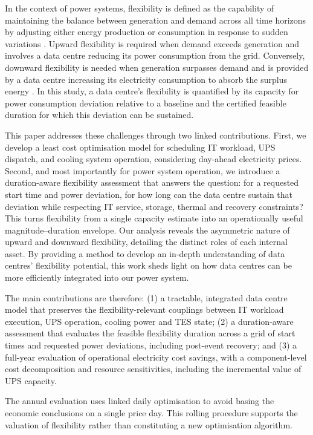 \documentclass[lettersize,journal]{IEEEtran}
\newcommand{\rev}[1]{#1}
\begin{document}
In the context of power systems, flexibility is defined as the capability of maintaining the balance between generation and demand across all time horizons by adjusting either energy production or consumption in response to sudden variations \cite{Centrica2020LEM, EEAACER2023Flex, neso2025future, Nosair2015TSTE}. Upward flexibility is required when demand exceeds generation and involves a data centre reducing its power consumption from the grid. Conversely, downward flexibility is needed when generation surpasses demand and is provided by a data centre increasing its electricity consumption to absorb the surplus energy \cite{Centrica2020LEM, NG2017SNAPS}. In this study, a data centre's flexibility is quantified by its capacity for power consumption deviation relative to a baseline and the certified feasible duration for which this deviation can be sustained.

\rev{This paper addresses these challenges through two linked contributions. First, we develop a least cost optimisation model for scheduling IT workload, UPS dispatch, and cooling system operation, considering day-ahead electricity prices. Second, and most importantly for power system operation, we introduce a duration-aware flexibility assessment that answers the question: for a requested start time and power deviation, for how long can the data centre sustain that deviation while respecting IT service, storage, thermal and recovery constraints? This turns flexibility from a single capacity estimate into an operationally useful magnitude--duration envelope.} Our analysis reveals the asymmetric nature of upward and downward flexibility, detailing the distinct roles of each internal asset. By providing a method to develop an in-depth understanding of data centres' flexibility potential, this work sheds light on how data centres can be more efficiently integrated into our power system.

\rev{The main contributions are therefore: (1) a tractable, integrated data centre model that preserves the flexibility-relevant couplings between IT workload execution, UPS operation, cooling power and TES state; (2) a duration-aware assessment that evaluates the feasible flexibility duration across a grid of start times and requested power deviations, including post-event recovery; and (3) a full-year evaluation of operational electricity cost savings, with a component-level cost decomposition and resource sensitivities, including the incremental value of UPS capacity.}

The annual evaluation uses linked daily optimisation to avoid basing the economic conclusions on a single price day. This rolling procedure supports the valuation of flexibility rather than constituting a new optimisation algorithm.
\end{document}
